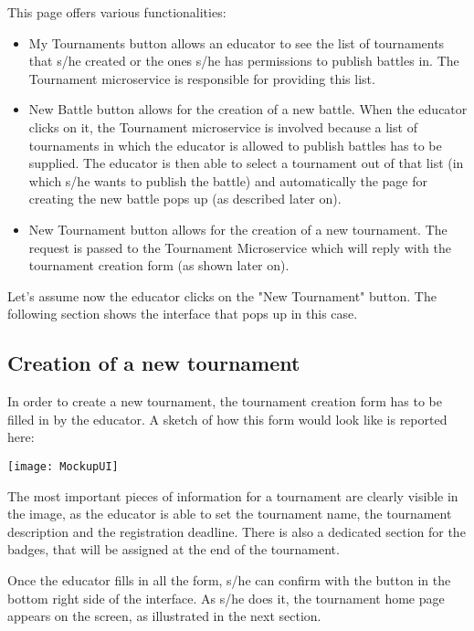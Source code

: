 This page offers various functionalities:
\begin{itemize}
	\item My Tournaments button allows an educator to see the list of tournaments that s/he created or the ones s/he has permissions to publish battles in. The Tournament microservice is responsible for providing this list.
	\item New Battle button allows for the creation of a new battle. When the educator clicks on it, the Tournament microservice is involved because a list of tournaments in which the educator is allowed to publish battles has to be supplied. The educator is then able to select a tournament out of that list (in which s/he wants to publish the battle) and automatically the page for creating the new battle pops up (as described later on).
	\item New Tournament button allows for the creation of a new tournament. The request is passed to the Tournament Microservice which will reply with the tournament creation form (as shown later on).
\end{itemize}

Let's assume now the educator clicks on the "New Tournament" button. The following section shows the interface that pops up in this case.

\begin{minipage}{\linewidth}
\subsection{Creation of a new tournament}
In order to create a new tournament, the tournament creation form has to be filled in by the educator. A sketch of how this form would look like is reported here:

\begin{center}
	\texttt{[image: MockupUI]}
\end{center}

\end{minipage}

The most important pieces of information for a tournament are clearly visible in the image, as the educator is able to set the tournament name, the tournament description and the registration deadline. There is also a dedicated section for the badges, that will be assigned at the end of the tournament.

Once the educator fills in all the form, s/he can confirm with the button in the bottom right side of the interface. As s/he does it, the tournament home page appears on the screen, as illustrated in the next section.

